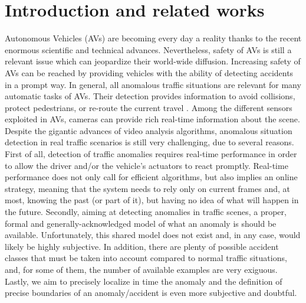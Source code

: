 \section{Introduction and related works}

Autonomous Vehicles (AVs) are becoming every day a reality thanks to the recent enormous scientific and technical advances.
Nevertheless, safety of AVs is still a relevant issue which can jeopardize their world-wide diffusion.
Increasing safety of AVs can be reached by providing vehicles with the ability of detecting accidents in a prompt way.
In general, all anomalous traffic situations are relevant for many automatic tasks of AVs.
Their detection provides information to avoid collisions, protect pedestrians, or re-route the current travel \cite{4298901}.
Among the different sensors exploited in AVs, cameras can provide rich real-time information about the scene.
Despite the gigantic advances of video analysis algorithms, anomalous situation detection in real traffic scenarios is still very challenging, due to several reasons.
First of all, detection of traffic anomalies requires real-time performance in order to allow the driver and/or the vehicle's actuators to react promptly.
Real-time performance does not only call for efficient algorithms, but also implies an online strategy, meaning that the system needs to rely only on current frames and, at most, knowing the past (or part of it), but having no idea of what will happen in the future.
Secondly, aiming at detecting anomalies in traffic scenes, a proper, formal and generally-acknowledged model of what an anomaly is should be available.
Unfortunately, this shared model does not exist and, in any case, would likely be highly subjective.
In addition, there are plenty of possible accident classes that must be taken into account compared to normal traffic situations, and, for some of them, the number of available examples are very exiguous.
Lastly, we aim to precisely localize in time the anomaly and the definition of precise boundaries of an anomaly/accident is even more subjective and doubtful.
